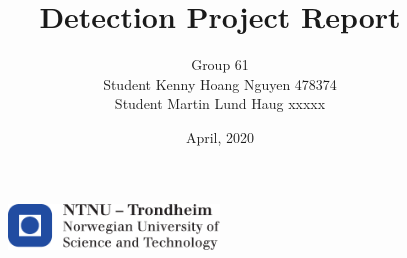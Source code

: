 \documentclass[11pt, a4paper, USenglish]{article} %
\begin{document}
\title{Detection Project Report}
\author{Group 61\\Student Kenny Hoang Nguyen 478374\\Student Martin Lund Haug xxxxx\\}
\date{April, 2020}
\begin{titlepage}
    \maketitle
    \begin{figure}
    \centering
    \includegraphics[width=0.5\textwidth]{figures/logontnu_eng.pdf}\\
    \end{figure}
    \thispagestyle{empty}
\end{titlepage}

\newpage

\thispagestyle{empty} %

\newpage
\tableofcontents
\thispagestyle{empty} %

\newpage
\setcounter{page}{1}






\newpage
{}
\printbibliography{}
\label{sec:bibliography}


\end{document}
